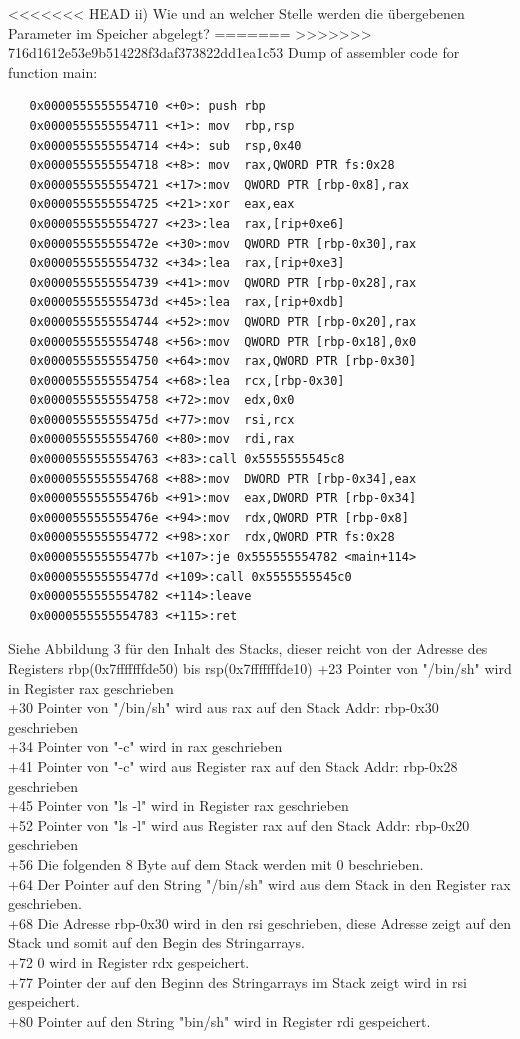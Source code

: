 \documentclass[12pt]{article}
\begin{document}
<<<<<<< HEAD
ii) Wie und an welcher Stelle werden die \"ubergebenen Parameter im Speicher abgelegt?
=======
>>>>>>> 716d1612e53e9b514228f3daf373822dd1ea1c53
Dump of assembler code for function main:
\begin{lstlisting}
   0x0000555555554710 <+0>:	push rbp
   0x0000555555554711 <+1>:	mov  rbp,rsp
   0x0000555555554714 <+4>:	sub  rsp,0x40
   0x0000555555554718 <+8>:	mov  rax,QWORD PTR fs:0x28
   0x0000555555554721 <+17>:mov  QWORD PTR [rbp-0x8],rax
   0x0000555555554725 <+21>:xor  eax,eax
   0x0000555555554727 <+23>:lea  rax,[rip+0xe6]
   0x000055555555472e <+30>:mov  QWORD PTR [rbp-0x30],rax
   0x0000555555554732 <+34>:lea  rax,[rip+0xe3]
   0x0000555555554739 <+41>:mov  QWORD PTR [rbp-0x28],rax
   0x000055555555473d <+45>:lea  rax,[rip+0xdb]
   0x0000555555554744 <+52>:mov  QWORD PTR [rbp-0x20],rax
   0x0000555555554748 <+56>:mov  QWORD PTR [rbp-0x18],0x0
   0x0000555555554750 <+64>:mov  rax,QWORD PTR [rbp-0x30]
   0x0000555555554754 <+68>:lea  rcx,[rbp-0x30]
   0x0000555555554758 <+72>:mov  edx,0x0
   0x000055555555475d <+77>:mov  rsi,rcx
   0x0000555555554760 <+80>:mov  rdi,rax
   0x0000555555554763 <+83>:call 0x5555555545c8
   0x0000555555554768 <+88>:mov  DWORD PTR [rbp-0x34],eax
   0x000055555555476b <+91>:mov  eax,DWORD PTR [rbp-0x34]
   0x000055555555476e <+94>:mov  rdx,QWORD PTR [rbp-0x8]
   0x0000555555554772 <+98>:xor  rdx,QWORD PTR fs:0x28
   0x000055555555477b <+107>:je 0x555555554782 <main+114>
   0x000055555555477d <+109>:call 0x5555555545c0
   0x0000555555554782 <+114>:leave  
   0x0000555555554783 <+115>:ret  
\end{lstlisting}
\newpage
Siehe Abbildung 3 für den Inhalt des Stacks, dieser reicht von der Adresse des Registers rbp(0x7fffffffde50) bis rsp(0x7fffffffde10)
+23 Pointer von "/bin/sh" wird in Register rax geschrieben \\
+30 Pointer von "/bin/sh" wird aus rax auf den Stack Addr: rbp-0x30 geschrieben\\
+34 Pointer von "-c" wird in rax geschrieben\\
+41 Pointer von "-c" wird aus Register rax auf den Stack Addr: rbp-0x28 geschrieben\\
+45 Pointer von "ls -l" wird in Register rax geschrieben\\
+52 Pointer von "ls -l" wird aus Register rax auf den Stack Addr: rbp-0x20 geschrieben\\
+56 Die folgenden 8 Byte auf dem Stack werden mit 0 beschrieben.\\
+64 Der Pointer auf den String "/bin/sh" wird aus dem Stack in den Register rax geschrieben.\\
+68 Die Adresse rbp-0x30 wird in den rsi geschrieben, diese Adresse zeigt auf den Stack und somit auf den Begin des Stringarrays.\\
+72	0 wird in Register rdx gespeichert.\\
+77 Pointer der auf den Beginn des Stringarrays im Stack zeigt wird in rsi gespeichert.\\ 
+80 Pointer auf den String "bin/sh" wird in Register rdi gespeichert.\\
\end{document}
